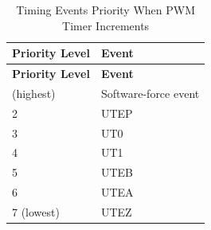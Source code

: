 \begin{longtable}[c]{|p{6cm}|p{6cm}|}
    \caption{Timing Events Priority When PWM Timer Increments}
    \label{tab:mcpwm-evt-prio-u}
    \\\hline
    \rowcolor{lightgray}
    \textbf{Priority Level}
    & \textbf{Event}
    \\\hline
    \endfirsthead
    \hline
    \rowcolor{lightgray}   
    \textbf{Priority Level}
    & \textbf{Event}
    \\\hline
    \endhead
    \hline
    \endfoot
    1 (highest)
    & Software-force event
    \\\hline
    2
    & UTEP
    \\\hline
    3
    & UT0
    \\\hline
    4
    & UT1
    \\\hline
    5
    & UTEB
    \\\hline
    6
    & UTEA
    \\\hline
    7 (lowest)
    & UTEZ  
\end{longtable}